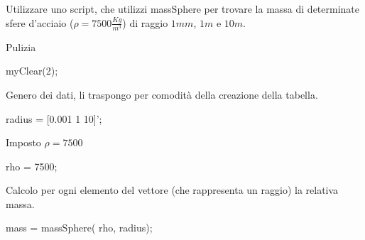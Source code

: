 


\begin{par}
\begin{flushleft}
Utilizzare uno script, che utilizzi massSphere per trovare la massa di determinate sfere d'acciaio ($\rho =7500\frac{Kg}{m^3 }$) di raggio $1mm$, $1m$ e $10m$.
\end{flushleft}
\end{par}


\begin{par}
\begin{flushleft}
Pulizia
\end{flushleft}
\end{par}

\begin{matlabcode}
myClear(2);
\end{matlabcode}


\vspace{1em}
\begin{par}
\begin{flushleft}
Genero dei dati, li traspongo per comodità della creazione della tabella.
\end{flushleft}
\end{par}

\begin{matlabcode}
radius = [0.001 1 10]';

\end{matlabcode}


\vspace{1em}
\begin{par}
\begin{flushleft}
Imposto $\rho =7500$ 
\end{flushleft}
\end{par}

\begin{matlabcode}
   rho = 7500;
\end{matlabcode}


\vspace{1em}
\begin{par}
\begin{flushleft}
Calcolo per ogni elemento del vettore (che rappresenta un raggio) la relativa massa.
\end{flushleft}
\end{par}

\begin{matlabcode}
  mass = massSphere( rho, radius);
\end{matlabcode}


